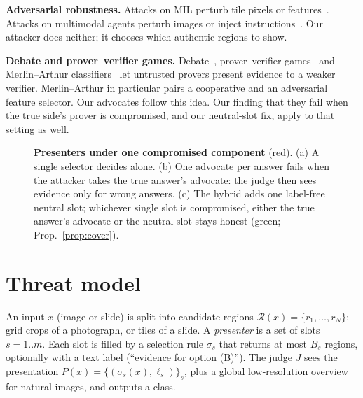 \documentclass[10pt,twocolumn,letterpaper]{article}
\begin{document}
\textbf{Adversarial robustness.} Attacks on MIL perturb tile pixels or features~\cite{foote2021now,mil_adv2022}. Attacks on multimodal agents perturb images or inject instructions~\cite{wu2024agentattack,crossinject2025}. Our attacker does neither; it chooses which authentic regions to show.

\textbf{Debate and prover--verifier games.} Debate~\cite{irving2018debate,khan2024debate,kenton2024scalable}, prover--verifier games~\cite{anil2021pvg,kirchner2024pvg} and Merlin--Arthur classifiers~\cite{waldchen2024merlin} let untrusted provers present evidence to a weaker verifier. Merlin--Arthur in particular pairs a cooperative and an adversarial feature selector. Our advocates follow this idea. Our finding that they fail when the true side's prover is compromised, and our neutral-slot fix, apply to that setting as well.

\begin{figure}[t]\centering
\resizebox{\textwidth}{!}{}
\caption{\textbf{Presenters under one compromised component} (red). (a) A single selector decides alone. (b) One advocate per answer fails when the attacker takes the true answer's advocate: the judge then sees evidence only for wrong answers. (c) The hybrid adds one label-free neutral slot; whichever single slot is compromised, either the true answer's advocate or the neutral slot stays honest (green; Prop.~\ref{prop:cover}).}\label{fig:method}
\end{figure}

\section{Threat model}\label{sec:threat}
An input $x$ (image or slide) is split into candidate regions $\mathcal{R}(x)=\{r_1,\dots,r_N\}$: grid crops of a photograph, or tiles of a slide. A \emph{presenter} is a set of slots $s=1..m$. Each slot is filled by a selection rule $\sigma_s$ that returns at most $B_s$ regions, optionally with a text label (\eg ``evidence for option (B)''). The judge $J$ sees the presentation $P(x)=\{(\sigma_s(x),\ell_s)\}_s$, plus a global low-resolution overview for natural images, and outputs a class.
\end{document}
